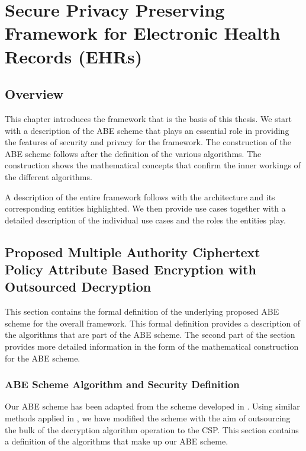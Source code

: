 \chapter{Secure Privacy Preserving Framework for Electronic Health Records (EHRs)}
\label{chap:framework_and_system_description}

\renewcommand{\theenumi}{\Alph{enumi}}
\renewcommand{\theenumii}{\roman{enumii}}


\section{Overview}

This chapter introduces the framework that is the basis of this thesis. We start with a description of the ABE scheme that plays an essential role in providing the features of security and privacy for the framework. The construction of the ABE scheme follows after the definition of the various algorithms. The construction shows the mathematical concepts that confirm the inner workings of the different algorithms.

A description of the entire framework follows with the architecture and its corresponding entities highlighted. We then provide use cases together with a detailed description of the individual use cases and the roles the entities play.


\section{Proposed Multiple Authority Ciphertext Policy Attribute Based Encryption with Outsourced Decryption}

This section contains the formal definition of the underlying proposed ABE scheme for the overall framework. This formal definition provides a description of the algorithms that are part of the ABE scheme. The second part of the section provides more detailed information in the form of the mathematical construction for the ABE scheme.

\subsection{ABE Scheme Algorithm and Security Definition}

Our ABE scheme has been adapted from the scheme developed in \cite{Yang2014}. Using similar methods applied in \cite{Green2011outsource}, we have modified the scheme with the aim of outsourcing the bulk of the decryption algorithm operation to the CSP. This section contains a definition of the algorithms that make up our ABE scheme.

